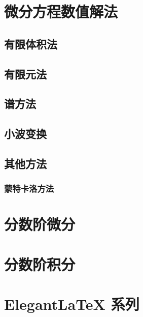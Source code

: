 \documentclass[cn,11pt,color=green,titlestyle=hang,mode=fancy,cite=numbers]{elegantbook}
\begin{document}
    	
    	
    	 
    	
	\part{微分方程数值解法}
	
    	
		\chapter{有限体积法}
		
		\chapter{有限元法}

		\chapter{谱方法}
		
		\chapter{小波变换}
		
		\chapter{其他方法}
			\section{蒙特卡洛方法}
				
	\part{分数阶微分}
		
		
	\part{分数阶积分}
	
	
	\part{Elegant\LaTeX{} 系列}
	
\end{document}
